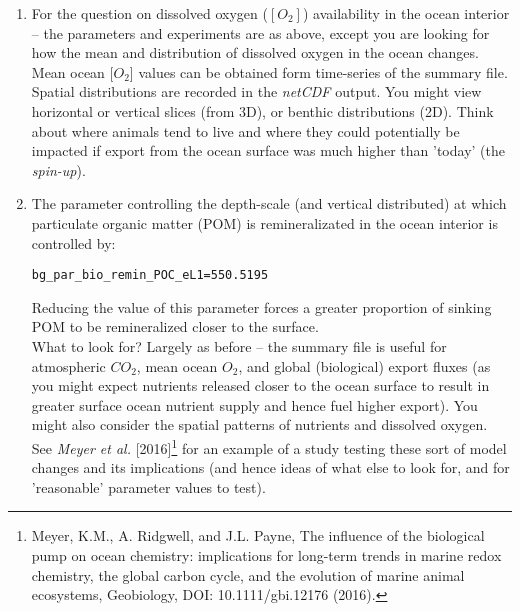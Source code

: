 \documentclass[11pt,fleqn]{book} %
\begin{document}
\begin{enumerate}[noitemsep]
\vspace{1mm}
\item For the question on dissolved oxygen (\([O_{2}]\)) availability in the ocean interior -- the parameters and experiments are as above, except you are looking for how the mean and distribution of dissolved oxygen in the ocean changes. Mean ocean [\(O_{2}\)] values can be obtained form time-series of the summary file. Spatial distributions are recorded in the \textit{netCDF} output. You might view horizontal or vertical slices (from 3D), or benthic distributions (2D). Think about where animals tend to live and where they could potentially be impacted if export from the ocean surface was much higher than 'today' (the \textit{spin-up}).

\vspace{1mm}
\item The parameter controlling the depth-scale (and vertical distributed) at which particulate organic matter (POM) is remineralizated in the ocean interior is controlled by:
\vspace{-1pt}\small\begin{verbatim}
bg_par_bio_remin_POC_eL1=550.5195
\end{verbatim}\normalsize\vspace{-1pt}
Reducing the value of this parameter forces a greater proportion of sinking POM to be remineralized closer to the surface.
\\What to look for? Largely as before -- the summary file is useful for atmospheric \(CO_{2}\), mean ocean {\(O_{2}\)}, and global (biological) export fluxes (as you might expect nutrients released closer to the ocean surface to result in greater surface ocean nutrient supply and hence fuel higher export). You might also consider the spatial patterns of nutrients and dissolved oxygen.
\\See \textit{Meyer et al.} [2016]\footnote{Meyer, K.M., A. Ridgwell, and J.L. Payne, The influence of the biological pump on ocean chemistry: implications for long-term trends in marine redox chemistry, the global carbon cycle, and the evolution of marine animal ecosystems, Geobiology, DOI: 10.1111/gbi.12176 (2016).} for an example of a study testing these sort of model changes and its implications (and hence ideas of what else to look for, and for 'reasonable' parameter values to test).


\end{enumerate}
\end{document}
